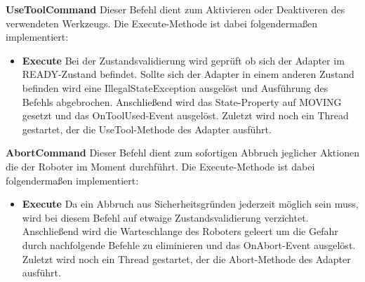 \textbf{UseToolCommand}
\newline
Dieser Befehl dient zum Aktivieren oder Deaktiveren des verwendeten Werkzeugs. Die Execute-Methode ist dabei folgendermaßen implementiert:
\begin{itemize}
\item \textbf{Execute}
\newline
Bei der Zustandsvalidierung wird geprüft ob sich der Adapter im READY-Zustand befindet. Sollte sich der Adapter in einem anderen Zustand befinden wird eine IllegalStateException ausgelöst und Ausführung des Befehls abgebrochen. Anschließend wird das State-Property auf MOVING gesetzt und das OnToolUsed-Event ausgelöst. Zuletzt wird noch ein Thread gestartet, der die UseTool-Methode des Adapter ausführt. 
\end{itemize}

\textbf{AbortCommand}
\newline
Dieser Befehl dient zum sofortigen Abbruch jeglicher Aktionen die der Roboter im Moment durchführt. Die Execute-Methode ist dabei folgendermaßen implementiert:
\begin{itemize}
\item \textbf{Execute}
\newline
Da ein Abbruch aus Sicherheitsgründen jederzeit möglich sein muss, wird bei diesem Befehl auf etwaige Zustandsvalidierung verzichtet. Anschließend wird die Warteschlange des Roboters geleert um die Gefahr durch nachfolgende Befehle zu eliminieren und das OnAbort-Event ausgelöst. Zuletzt wird noch ein Thread gestartet, der die Abort-Methode des Adapter ausführt. 
\end{itemize}